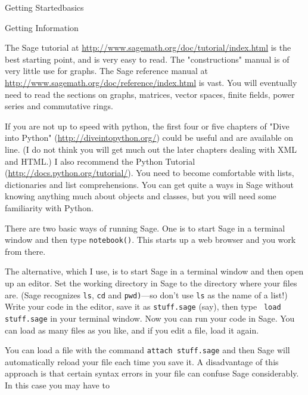 \begin{chap}{Getting Started}{basics}
    
\begin{sect}{Getting Information}
%
\begin{para}
The Sage tutorial at \url{http://www.sagemath.org/doc/tutorial/index.html}
is the best starting point, and is very easy to read.  The "constructions" manual 
is of very little use for graphs. The Sage reference manual at
\url{http://www.sagemath.org/doc/reference/index.html} is vast. You will eventually 
need to read the sections on graphs, matrices, vector spaces, finite fields,
power series and commutative rings.
\end{para}
%
\begin{para}
If you are not up to speed with python, the first four or five chapters of 
"Dive into Python"  (\url{http://diveintopython.org/})
could be useful and are available on line.  (I do not think
you will get much out the later chapters dealing with XML and HTML.)
I also recommend the Python Tutorial (\url{http://docs.python.org/tutorial/}).  
You need to become comfortable with lists, dictionaries and list comprehensions.
You can get quite a ways in Sage without knowing anything much about objects 
and classes, but you will need some familiarity with Python.
\end{para}
%
\begin{para}
There are two basic ways of running Sage.  One is to start Sage in a
terminal window and then type \texttt{notebook()}.  This starts up a 
web browser and you work from there.
\end{para}
%
\begin{para}
The alternative, which I use, is to start Sage in a terminal window and then 
open up an editor. Set the working directory in Sage to the directory where your 
files are. (Sage recognizes \texttt{ls}, \texttt{cd} and \texttt{pwd)}---so don't use
\texttt{ls} as the name of a list!) Write your code in the editor, save it as
\texttt{stuff.sage} (say), then type  \texttt{ load stuff.sage} in your terminal window. 
Now you can run your code in Sage. You can load as many files as you like, and if 
you edit a file, load it again.
\end{para}
%
\begin{para}
You can load a file with the command \texttt{attach stuff.sage} and then
Sage will automatically reload your file each time
you save it.  A disadvantage of this approach is that certain syntax errors 
in your file can confuse Sage considerably.  In this case you may have to 

\end{para}
\end{sect}
\end{chap}
